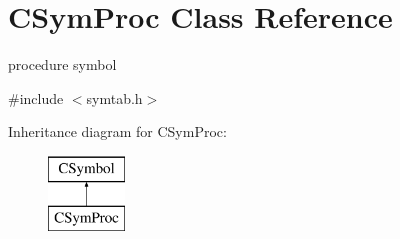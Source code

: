 \hypertarget{classCSymProc}{\section{C\-Sym\-Proc Class Reference}
\label{classCSymProc}
}


procedure symbol  




{\ttfamily \#include $<$symtab.\-h$>$}

Inheritance diagram for C\-Sym\-Proc\-:\begin{figure}[H]
\begin{center}
\leavevmode
\includegraphics[height=2.000000cm]{classCSymProc}
\end{center}
\end{figure}
